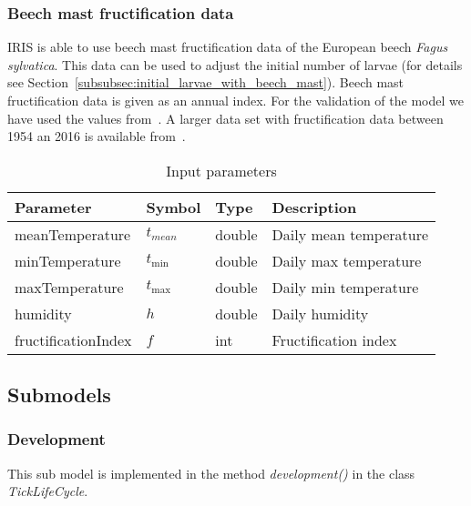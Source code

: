 \documentclass[a4paper, 11pt]{scrartcl}
\begin{document}

\subsubsection{Beech mast fructification data}\label{subsubsec:beech_mast_data}
IRIS is able to use beech mast fructification data of the European beech \textit{Fagus sylvatica}. This data can be used to adjust the initial number of larvae
(for details see Section~\ref{subsubsec:initial_larvae_with_beech_mast}). Beech mast fructification data is given as an annual index. For the validation of the model we have
used the values from~\cite{Brugger.2018}. A larger data set with fructification data between 1954 an 2016 is available from~\cite{Konnert.2016}.


\begin{table}[h!]
\caption{Input parameters}
\label{tab:input_parameters}
\begin{tabularx}{\textwidth}{llll}
\toprule
\textbf{Parameter} & \textbf{Symbol} & \textbf{Type}     & \textbf{Description}       \\
\midrule
meanTemperature    & $t_{mean}$      & double            & Daily mean temperature     \\
minTemperature     & $t_{\min}$      & double            & Daily max temperature      \\
maxTemperature     & $t_{\max}$      & double            & Daily min temperature      \\
humidity           & $h$             & double            & Daily humidity             \\
\midrule
fructificationIndex & $f$            & int               & Fructification index       \\
\bottomrule
\end{tabularx}
\end{table}


\newpage
\subsection{Submodels}

\subsubsection{Development}
This sub model is implemented in the method \textit{development()} in the class \textit{TickLifeCycle}.
\end{document}
